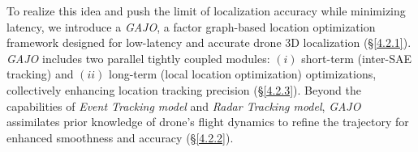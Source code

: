 

To realize this idea and push the limit of localization accuracy while minimizing latency, we introduce a \textit{GAJO}, a factor graph-based location optimization framework designed for low-latency and accurate drone 3D localization (§\ref{4.2.1}).
\textit{GAJO} includes two parallel tightly coupled modules: $(i)$ short-term (inter-SAE tracking) and $(ii)$ long-term (local location optimization) optimizations, collectively enhancing location tracking precision (§\ref{4.2.3}).
Beyond the capabilities of \textit{Event Tracking model} and \textit{Radar Tracking model}, \textit{GAJO} assimilates prior knowledge of drone's flight dynamics to refine the trajectory for enhanced smoothness and accuracy (§\ref{4.2.2}).


